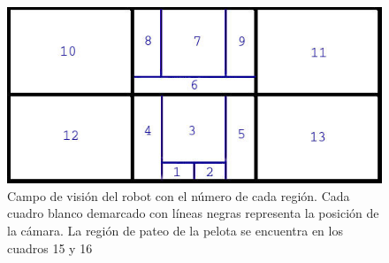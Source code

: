 


\begin{figure}[hbtp]

\centering
\includegraphics[scale=0.5]{imagenes/Regiones.jpg}
\caption{Campo de visión del robot con el número de cada región. Cada cuadro blanco demarcado con líneas negras representa la posición de la cámara. La región de pateo de la pelota se encuentra en los cuadros 15 y 16 }
\label{divisionCam}
\end{figure}
